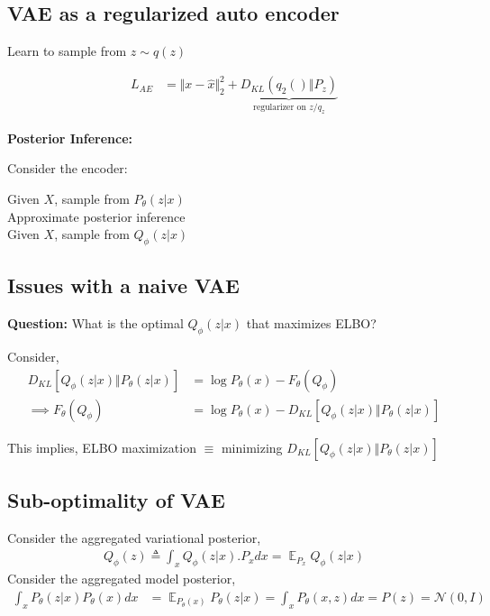 \documentclass[11pt]{article}
\DeclareMathOperator*{\E}{\mathbb{E}}
\begin{document}
\subsection{VAE as a regularized auto encoder}
\label{sec:vae-as-regularized}

Learn to sample from $z \sim q(z)$

\begin{align*}
  L_{AE} &= \Vert x - \hat{x}\Vert_2^2 + \underbrace{D_{KL}(q_2() \Vert P_z)}_{\text{regularizer on $z/q_z$}}
\end{align*}

\textbf{Posterior Inference:}

Consider the encoder:


Given $X$, sample from $P_{\theta}(z|x)$ \\
Approximate posterior inference \\
Given $X$, sample from $Q_{\phi}(z|x)$ \\

\subsection{Issues with a naive VAE}
\label{sec:issues-with-naive}

\textbf{Question:} What is the optimal $Q_{\phi}(z|x)$ that maximizes ELBO?

Consider,
\begin{align*}
  D_{KL}\left[ Q_{\phi}(z|x) \Vert P_{\theta}(z|x) \right]
  &= \log P_{\theta}(x) - F_{\theta}(Q_{\phi}) \\
  \implies F_{\theta}(Q_{\phi})
  &= \log P_{\theta}(x) - D_{KL}\left[ Q_{\phi}(z|x) \Vert P_{\theta}(z|x) \right]
\end{align*}

This implies,
ELBO maximization $\equiv$ minimizing $D_{KL}\left[ Q_{\phi}(z|x) \Vert P_{\theta}(z|x) \right]$

\subsection{Sub-optimality of VAE}
\label{sec:sub-optimality-vae}

Consider the aggregated variational posterior,
\begin{align*}
  Q_{\phi}(z) \triangleq \int_x Q_{\phi}(z|x).P_xdx = \E_{P_x} Q_{\phi}(z|x)
\end{align*}
Consider the aggregated model posterior,
\begin{align*}
  \int_x P_{\theta}(z|x) P_{\theta}(x)dx &= \E_{P_{\theta}(x)}P_{\theta}(z|x)
                                           = \int_x P_{\theta}(x,z)dx = P(z) = \mathcal{N}(0, I)
\end{align*}
\end{document}
